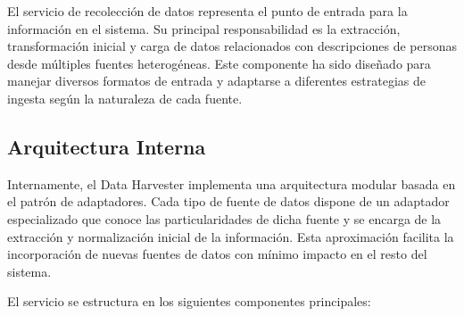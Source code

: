 \documentclass[12pt,a4paper]{article}
\begin{document}
El servicio de recolección de datos representa el punto de entrada para la información en el sistema. Su principal responsabilidad es la extracción, transformación inicial y carga de datos relacionados con descripciones de personas desde múltiples fuentes heterogéneas. Este componente ha sido diseñado para manejar diversos formatos de entrada y adaptarse a diferentes estrategias de ingesta según la naturaleza de cada fuente.

\subsection{Arquitectura Interna}
\label{subsec:dh-arquitectura}

Internamente, el Data Harvester implementa una arquitectura modular basada en el patrón de adaptadores. Cada tipo de fuente de datos dispone de un adaptador especializado que conoce las particularidades de dicha fuente y se encarga de la extracción y normalización inicial de la información. Esta aproximación facilita la incorporación de nuevas fuentes de datos con mínimo impacto en el resto del sistema.

El servicio se estructura en los siguientes componentes principales:
\end{document}
